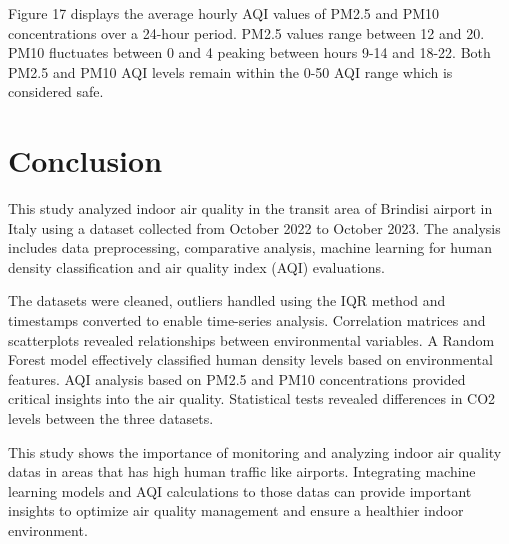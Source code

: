 \documentclass[conference]{IEEEtran}
\begin{document}
Figure 17 displays the average hourly AQI values of PM2.5 and PM10 concentrations over a 24-hour period. PM2.5 values range between 12 and 20. PM10 fluctuates between 0 and 4 peaking between hours 9-14 and 18-22. Both PM2.5 and PM10 AQI levels remain within the 0-50 AQI range which is considered safe.
\vspace{5mm}

\section{Conclusion}

This study analyzed indoor air quality in the transit area of Brindisi airport in Italy using a dataset collected from October 2022 to October 2023. The analysis includes data preprocessing, comparative analysis, machine learning for human density classification and air quality index (AQI) evaluations.
\vspace{5mm}

The datasets were cleaned, outliers handled using the IQR method and timestamps converted to enable time-series analysis. Correlation matrices and scatterplots revealed relationships between environmental variables. A Random Forest model effectively classified human density levels based on environmental features. AQI analysis based on PM2.5 and PM10 concentrations provided critical insights into the air quality. Statistical tests revealed differences in CO2 levels between the three datasets. 
\vspace{5mm}

This study shows the importance of monitoring and analyzing indoor air quality datas in areas that has high human traffic like airports. Integrating machine learning models and AQI calculations to those datas can provide important insights to optimize air quality management and ensure a healthier indoor environment.
\vspace{5mm}
\end{document}
